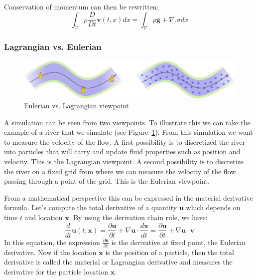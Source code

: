 Conservation of momentum can then be rewritten:
\begin{equation}
\label{eq:volumetricMomentumConservation}
\displaystyle
\int_{\mathcal{V}} \rho \frac{D}{Dt} \mathbf{v}(t,x) dx = \int_{\mathcal{V}} \rho \mathbf{g} + \nabla. \sigma dx
\end{equation}

\subsubsection{Lagrangian vs. Eulerian}

\begin{figure}[!ht]
\centering
\includegraphics[scale=0.5]{images/continuum_mechanics/eulerianVsLagrangian.png}
\caption[STAR mechanics: Eulerian vs. Lagrangian]{\label{fig:EulerianVsLagrangian} Eulerian vs. Lagrangian viewpoint}
\end{figure}

A simulation can be seen from two viewpoints. To illustrate this we can take the example of a river that we simulate (see Figure~\ref{fig:EulerianVsLagrangian}). From this simulation we want to measure the velocity of the flow. A first possibility is to discretized the river into particles that will carry and update fluid properties such as position and velocity. This is the Lagrangian viewpoint. A second possibility is to discretize the river on a fixed grid from where we can measure the velocity of the flow passing through a point of the grid. This is the Eulerian viewpoint.

From a mathematical perspective this can be expressed in the material derivative formula. Let's compute the total derivative of a quantity $\mathbf{u}$ which depends on time $t$ and location $\mathbf{x}$. By using the derivation chain rule, we have:
\begin{equation}
\frac{d}{dt}\mathbf{u}(t,\mathbf{x}) = 
\frac{\partial \mathbf{u}}{\partial t} + \nabla \mathbf{u} \cdot \frac{d\mathbf{x}}{dt} =
\frac{\partial \mathbf{u}}{\partial t} + \nabla \mathbf{u} \cdot \mathbf{v} 
\end{equation}
In this equation, the expression $\frac{\partial \mathbf{u}}{\partial t}$ is the derivative at fixed point, the Eulerian derivative. Now if the location $\mathbf{x}$ is the position of a particle, then the total derivative is called the material or Lagrangian derivative and measures the derivative for the particle location $\mathbf{x}$.

